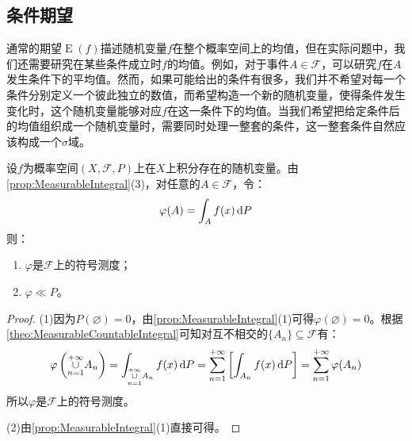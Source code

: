 \subsection{条件期望}
通常的期望$\operatorname{E}(f)$描述随机变量$f$在整个概率空间上的均值，但在实际问题中，我们还需要研究在某些条件成立时$f$的均值。例如，对于事件$A\in\mathscr{F}$，可以研究$f$在$A$发生条件下的平均值。然而，如果可能给出的条件有很多，我们并不希望对每一个条件分别定义一个彼此独立的数值，而希望构造一个新的随机变量，使得条件发生变化时，这个随机变量能够对应$f$在这一条件下的均值。当我们希望把给定条件后的均值组织成一个随机变量时，需要同时处理一整套的条件，这一整套条件自然应该构成一个$\sigma$域。
\begin{lemma}\label{lem:ConditionalExpectation}
	设$f$为概率空间$(X,\mathscr{F},P)$上在$X$上积分存在的随机变量。由\cref{prop:MeasurableIntegral}(3)，对任意的$A\in\mathscr{F}$，令：
	\begin{equation*}
		\varphi(A)=\int_{A}f(x)\mathop{}\!\mathrm{d} P
	\end{equation*}
	则：
	\begin{enumerate}
		\item $\varphi$是$\mathscr{F}$上的符号测度；
		\item $\varphi\ll P$。
	\end{enumerate}
\end{lemma}
\begin{proof}
	(1)因为$P(\varnothing)=0$，由\cref{prop:MeasurableIntegral}(1)可得$\varphi(\varnothing)=0$。根据\cref{theo:MeasurableCountableIntegral}可知对互不相交的$\{A_n\}\subseteq\mathscr{F}$有：
	\begin{equation*}
		\varphi\left(\underset{n=1}{\overset{+\infty}{\cup}}A_n\right)=\int_{\underset{n=1}{\overset{+\infty}{\cup}}A_n}f(x)\mathop{}\!\mathrm{d} P=\sum_{n=1}^{+\infty}\left[\int_{A_n}f(x)\mathop{}\!\mathrm{d} P\right]=\sum_{n=1}^{+\infty}\varphi(A_n)
	\end{equation*}
	所以$\varphi$是$\mathscr{F}$上的符号测度。\par
	(2)由\cref{prop:MeasurableIntegral}(1)直接可得。
\end{proof}

